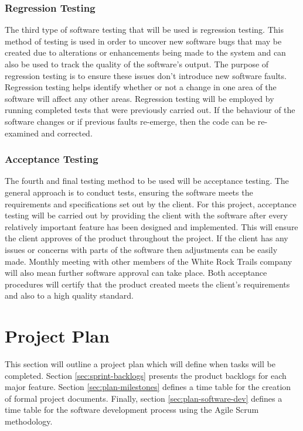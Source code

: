 \documentclass[11pt,a4paper]{article}
\begin{document}
\subsubsection{Regression Testing}
The third type of software testing that will be used is regression testing. This method of testing is used in order to uncover new software bugs that may be created due to alterations or enhancements being made to the system and can also be used to track the quality of the software's output. The purpose of regression testing is to ensure these issues don't introduce new software faults. Regression testing helps identify whether or not a change in one area of the software will affect any other areas. Regression testing will be employed by running completed tests that were previously carried out. If the behaviour of the software changes or if previous faults re-emerge, then the code can be re-examined and corrected. 

\subsubsection{Acceptance Testing}
The fourth and final testing method to be used will be acceptance testing. The general approach is to conduct tests, ensuring the software meets the requirements and specifications set out by the client. For this project, acceptance testing will be carried out by providing the client with the software after every relatively important feature has been designed and implemented. This will ensure the client approves of the product throughout the project. If the client has any issues or concerns with parts of the software then adjustments can be easily made. Monthly meeting with other members of the White Rock Trails company will also mean further software approval can take place. Both acceptance procedures will certify that the product created meets the client's requirements and also to a high quality standard.

\section{Project Plan}
\label{sec:project-plan}

This section will outline a project plan which will define when tasks will be completed. Section \ref{sec:sprint-backlogs} presents the product backlogs for each major feature. Section  \ref{sec:plan-milestones} defines a time table for the creation of formal project documents. Finally, section \ref{sec:plan-software-dev} defines a time table for the software development process using the Agile Scrum methodology.
\end{document}
